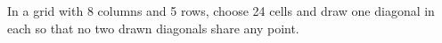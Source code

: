In a grid with 8 columns and 5 rows, choose 24 cells and draw one diagonal in each so that no two drawn diagonals share any point.
